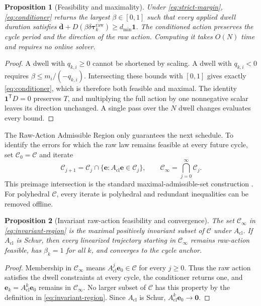 \documentclass[pdflatex,iicol,sn-mathphys-ay]{sn-jnl}
\newtheorem{proposition}{Proposition}
\newcommand{\vect}[1]{\bm{#1}}
\newcommand{\dtau}{\delta\vect{\tau}}
\begin{document}
\begin{proposition}[Feasibility and maximality]
\label{prop:conditioner}
Under \eqref{eq:strict-margin}, \eqref{eq:conditioner} returns the largest $\beta\in[0,1]$ such that every applied dwell duration satisfies $\bar{\vect{d}}+D(\beta\dtau_k^{\mathrm{raw}})\ge d_{\min}\vect{1}$. The conditioned action preserves the cycle period and the direction of the raw action. Computing it takes $O(N)$ time and requires no online solver.
\end{proposition}

\begin{proof}
A dwell with $q_{k,i}\ge0$ cannot be shortened by scaling. A dwell with $q_{k,i}<0$ requires $\beta\le m_i/(-q_{k,i})$. Intersecting these bounds with $[0,1]$ gives exactly \eqref{eq:conditioner}, which is therefore both feasible and maximal. The identity $\vect{1}^{\mathsf T}D=0$ preserves $T$, and multiplying the full action by one nonnegative scalar leaves its direction unchanged. A single pass over the $N$ dwell changes evaluates every bound.
\end{proof}

The Raw-Action Admissible Region only guarantees the next schedule. To identify the errors for which the raw law remains feasible at every future cycle, set $\mathcal C_0=\mathcal C$ and iterate
\begin{equation}
    \mathcal C_{j+1}=\mathcal C_j\cap
    \{\vect{e}:A_{\mathrm{cl}}\vect{e}\in\mathcal C_j\},
    \qquad
    \mathcal C_\infty=\bigcap_{j=0}^{\infty}\mathcal C_j.
    \label{eq:invariant-region}
\end{equation}
This preimage intersection is the standard maximal-admissible-set construction \cite{gilbert1991maximal}. For polyhedral $\mathcal C$, every iterate is polyhedral and redundant inequalities can be removed offline.

\begin{proposition}[Invariant raw-action feasibility and convergence]
\label{prop:invariant-region}
The set $\mathcal C_\infty$ in \eqref{eq:invariant-region} is the maximal positively invariant subset of $\mathcal C$ under $A_{\mathrm{cl}}$. If $A_{\mathrm{cl}}$ is Schur, then every linearized trajectory starting in $\mathcal C_\infty$ remains raw-action feasible, has $\beta_k=1$ for all $k$, and converges to the cycle anchor.
\end{proposition}

\begin{proof}
Membership in $\mathcal C_\infty$ means $A_{\mathrm{cl}}^j\vect{e}_0\in\mathcal C$ for every $j\ge0$. Thus the raw action satisfies the dwell constraints at every cycle, the conditioner returns one, and $\vect{e}_k=A_{\mathrm{cl}}^k\vect{e}_0$ remains in $\mathcal C_\infty$. No larger subset of $\mathcal C$ has this property by the definition in \eqref{eq:invariant-region}. Since $A_{\mathrm{cl}}$ is Schur, $A_{\mathrm{cl}}^k\vect{e}_0\to\vect{0}$.
\end{proof}
\end{document}
